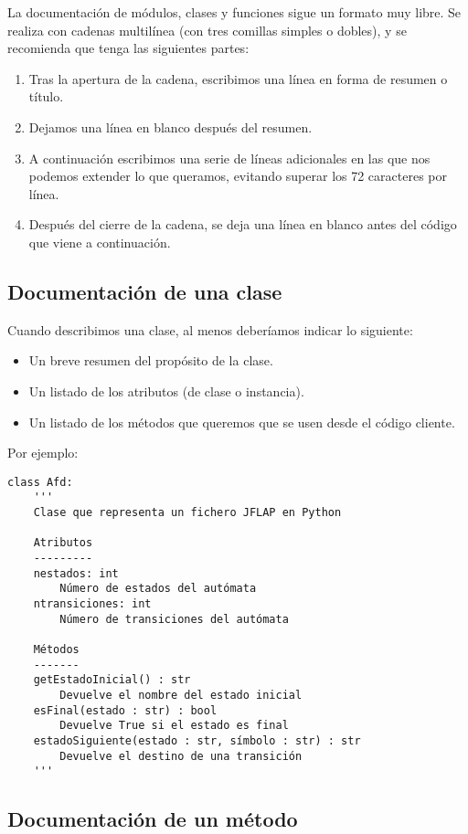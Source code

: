 La documentación de módulos, clases y funciones sigue un formato muy libre. Se realiza con cadenas multilínea (con tres comillas simples o dobles), y se recomienda que tenga las siguientes partes:
\begin{enumerate}
	\item Tras la apertura de la cadena, escribimos una línea en forma de resumen o título.
	\item Dejamos una línea en blanco después del resumen.
	\item A continuación escribimos una serie de líneas adicionales en las que nos podemos extender lo que queramos, evitando superar los 72 caracteres por línea.
	\item Después del cierre de la cadena, se deja una línea en blanco antes del código que viene a continuación.
\end{enumerate}

\subsection{Documentación de una clase}

Cuando describimos una clase, al menos deberíamos indicar lo siguiente:
\begin{itemize}
	\item Un breve resumen del propósito de la clase.
	\item Un listado de los atributos (de clase o instancia).
	\item Un listado de los métodos que queremos que se usen desde el código cliente.
\end{itemize}

Por ejemplo:

\begin{lstlisting}
class Afd:
    '''
    Clase que representa un fichero JFLAP en Python
	
    Atributos
    ---------
    nestados: int 
        Número de estados del autómata
    ntransiciones: int
        Número de transiciones del autómata

    Métodos
    -------
    getEstadoInicial() : str
        Devuelve el nombre del estado inicial
    esFinal(estado : str) : bool
        Devuelve True si el estado es final
    estadoSiguiente(estado : str, símbolo : str) : str
        Devuelve el destino de una transición
    '''
\end{lstlisting}

\subsection{Documentación de un método}

